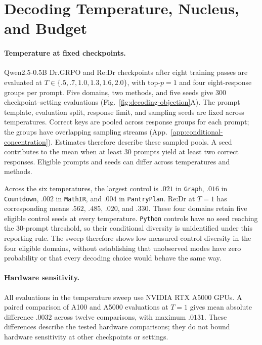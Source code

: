 \section{Decoding Temperature, Nucleus, and Budget}
\label{app:decoding-objection}

\paragraph{Temperature at fixed checkpoints.}
Qwen2.5-0.5B Dr.GRPO and Re:Dr checkpoints after eight training passes are
evaluated at $T\in\{.5,.7,1.0,1.3,1.6,2.0\}$, with top-$p=1$ and four
eight-response groups per prompt. Five domains, two methods, and five seeds
give 300 checkpoint--setting evaluations (Fig.~\ref{fig:decoding-objection}A).
The prompt template, evaluation split, response limit, and sampling seeds
are fixed across temperatures. Correct keys are pooled across response
groups for each prompt; the groups have overlapping sampling streams
(App.~\ref{app:conditional-concentration}). Estimates therefore describe
these sampled pools. A seed contributes to the \pmd{} mean when at least
30 prompts yield at least two correct responses. Eligible prompts and seeds
can differ across temperatures and methods.

Across the six temperatures, the largest control \pmd{} is $.021$ in
\texttt{Graph}, $.016$ in \texttt{Countdown}, $.002$ in \texttt{MathIR}, and $.004$ in \texttt{PantryPlan}.
Re:Dr at $T=1$ has corresponding means $.562$, $.485$, $.020$, and $.330$.
These four domains retain five eligible control seeds at every temperature.
\texttt{Python} controls have no seed reaching the 30-prompt threshold, so their
conditional diversity is unidentified under this reporting rule.
The sweep therefore shows low measured control diversity in the four
eligible domains, without establishing that unobserved modes have zero
probability or that every decoding choice would behave the same way.

\paragraph{Hardware sensitivity.}
All evaluations in the temperature sweep use NVIDIA RTX A5000 GPUs.
A paired comparison of A100 and A5000 evaluations at $T=1$ gives mean
absolute \pmd{} difference $.0032$ across twelve comparisons, with maximum
$.0131$. These differences describe the tested hardware comparisons;
they do not bound hardware sensitivity at other checkpoints or settings.

